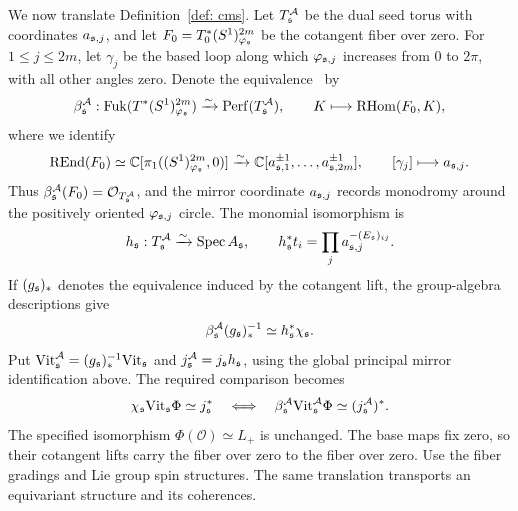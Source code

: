 \documentclass[12pt, letter]{amsart}
\theoremstyle{definition}
\newcommand{\OO}{\mathcal O}
\DeclareMathOperator{\RHom}{RHom}
\numberwithin{equation}{section}
\begin{document}
We now translate Definition~\ref{def: cms}.
Let $T_{\mathfrak{s}}^{\mathcal{A}}$ be the dual seed torus with coordinates $a_{\mathfrak{s},j}$,
and let $F_0=T^*_0(S^1)^{2m}_{\varphi_{\mathfrak{s}}}$ be the cotangent fiber over zero.
For $1\le j\le2m$, let $\gamma_j$ be the based loop along which
$\varphi_{\mathfrak{s},j}$ increases from $0$ to $2\pi$, with all other angles zero.
Denote the equivalence~\cite{Ab} by
\[
 \beta_{\fs}^{\cA}:\Fuk(T^*(S^1)^{2m}_{\varphi_{\fs}})
 \xrightarrow{\sim}\Perf(T_{\fs}^{\cA}),\qquad
 K\longmapsto\RHom(F_0,K),
\]
where we identify
\[
 \operatorname{REnd}(F_0)\simeq\mathbb C[\pi_1((S^1)^{2m}_{\varphi_{\mathfrak{s}}},0)]
 \xrightarrow{\sim}\mathbb C[a_{\mathfrak{s},1}^{\pm1},\ldots,a_{\mathfrak{s},2m}^{\pm1}],
 \qquad [\gamma_j]\longmapsto a_{\mathfrak{s},j}.
\]
Thus $\beta_{\fs}^{\cA}(F_0)=\OO_{T_{\fs}^{\cA}}$, and the mirror coordinate
$a_{\mathfrak{s},j}$ records monodromy around the positively oriented
$\varphi_{\mathfrak{s},j}$ circle. The monomial isomorphism is
\[
 h_{\mathfrak{s}}:T_{\mathfrak{s}}^{\mathcal{A}}\xrightarrow{\sim}\operatorname{Spec} A_{\mathfrak{s}},\qquad
 h_{\mathfrak{s}}^*t_i=\prod_j a_{\mathfrak{s},j}^{-(E_{\mathfrak{s}})_{ij}}.
\]
If $(g_{\mathfrak{s}})_*$ denotes the equivalence induced by the cotangent lift,
the group-algebra descriptions give
\[
 \beta_{\mathfrak{s}}^{\mathcal{A}}(g_{\mathfrak{s}})_*^{-1}
 \simeq h_{\mathfrak{s}}^*\chi_{\mathfrak{s}}.
\]
Put $\mathrm{Vit}_{\mathfrak{s}}^{\mathcal{A}}=(g_{\mathfrak{s}})_*^{-1}\mathrm{Vit}_{\mathfrak{s}}$
and $j_{\mathfrak{s}}^{\mathcal{A}}=j_{\mathfrak{s}}h_{\mathfrak{s}}$, using the global principal
mirror identification above. The required comparison becomes
\[
 \chi_{\mathfrak{s}}\mathrm{Vit}_{\mathfrak{s}}\Phi\simeq j_{\mathfrak{s}}^*
 \quad\Longleftrightarrow\quad
 \beta_{\mathfrak{s}}^{\mathcal{A}}\mathrm{Vit}_{\mathfrak{s}}^{\mathcal{A}}\Phi\simeq(j_{\mathfrak{s}}^{\mathcal{A}})^*.
\]
The specified isomorphism $\Phi(\OO)\simeq L_+$ is unchanged.
The base maps fix zero, so their cotangent lifts carry the fiber over zero
to the fiber over zero. Use the fiber gradings and Lie group spin structures.
The same translation transports an equivariant structure and its coherences.
\end{document}
